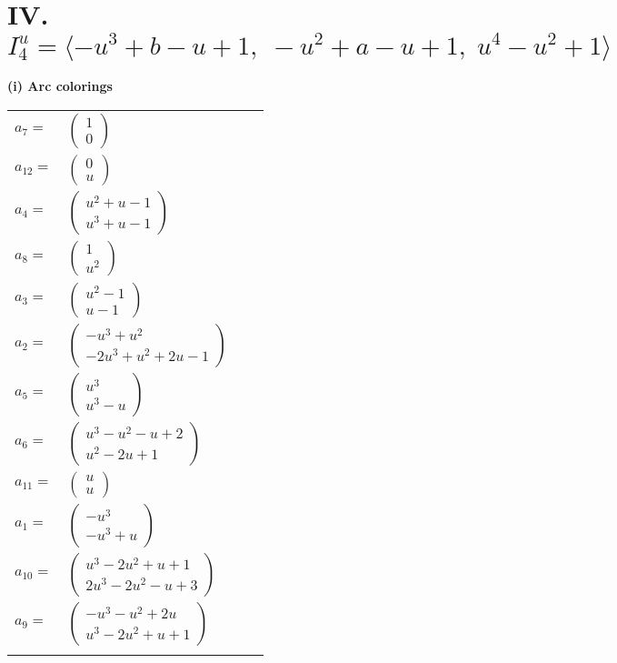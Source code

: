 \documentclass[1p]{elsarticle_modified}
\theoremstyle{definition}
\begin{document}
\centering \section*{IV. $I^u_{4}= \langle - u^3+b- u+1,\;- u^2+a- u+1,\;u^4- u^2+1 \rangle$}
\flushleft \textbf{(i) Arc colorings}\\
\begin{tabular}{m{7pt} m{180pt} m{7pt} m{180pt} }
\flushright $a_{7}=$&$\begin{pmatrix}1\\0\end{pmatrix}$ \\
\flushright $a_{12}=$&$\begin{pmatrix}0\\u\end{pmatrix}$ \\
\flushright $a_{4}=$&$\begin{pmatrix}u^2+u-1\\u^3+u-1\end{pmatrix}$ \\
\flushright $a_{8}=$&$\begin{pmatrix}1\\u^2\end{pmatrix}$ \\
\flushright $a_{3}=$&$\begin{pmatrix}u^2-1\\u-1\end{pmatrix}$ \\
\flushright $a_{2}=$&$\begin{pmatrix}- u^3+u^2\\-2 u^3+u^2+2 u-1\end{pmatrix}$ \\
\flushright $a_{5}=$&$\begin{pmatrix}u^3\\u^3- u\end{pmatrix}$ \\
\flushright $a_{6}=$&$\begin{pmatrix}u^3- u^2- u+2\\u^2-2 u+1\end{pmatrix}$ \\
\flushright $a_{11}=$&$\begin{pmatrix}u\\u\end{pmatrix}$ \\
\flushright $a_{1}=$&$\begin{pmatrix}- u^3\\- u^3+u\end{pmatrix}$ \\
\flushright $a_{10}=$&$\begin{pmatrix}u^3-2 u^2+u+1\\2 u^3-2 u^2- u+3\end{pmatrix}$ \\
\flushright $a_{9}=$&$\begin{pmatrix}- u^3- u^2+2 u\\u^3-2 u^2+u+1\end{pmatrix}$\\&\end{tabular}
\end{document}
